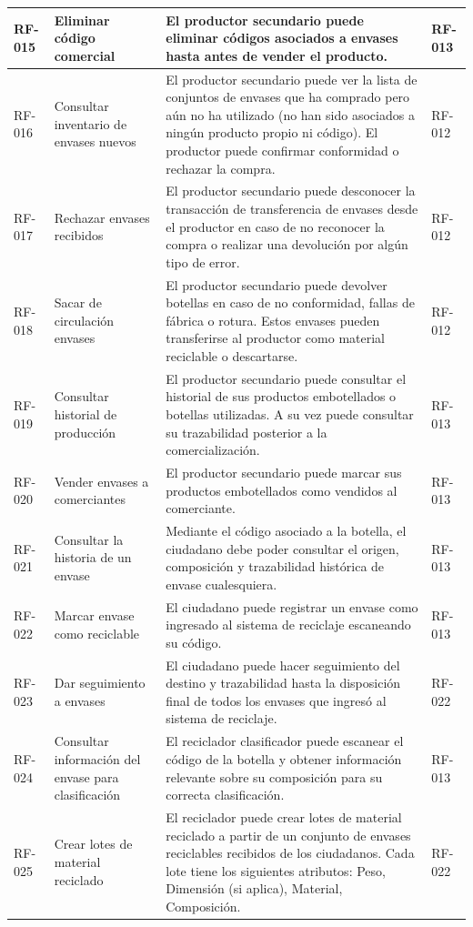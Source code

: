\begin{xltabular}{\textwidth}{@{} L{1.5cm} L{2.5cm} Y L{1.5cm} @{}}
	\hline
	RF-015 & Eliminar código comercial & El productor secundario puede eliminar códigos asociados a envases hasta antes de vender el producto. & RF-013 \\
	\hline
	RF-016 & Consultar inventario de envases nuevos & El productor secundario puede ver la lista de conjuntos de envases que ha comprado pero aún no ha utilizado (no han sido asociados a ningún producto propio ni código). El productor puede confirmar conformidad o rechazar la compra. & RF-012 \\
	\hline
	RF-017 & Rechazar envases recibidos & El productor secundario puede desconocer la transacción de transferencia de envases desde el productor en caso de no reconocer la compra o realizar una devolución por algún tipo de error. & RF-012 \\
	\hline
	RF-018 & Sacar de circulación envases & El productor secundario puede devolver botellas en caso de no conformidad, fallas de fábrica o rotura. Estos envases pueden transferirse al productor como material reciclable o descartarse. & RF-012 \\
	\hline
	RF-019 & Consultar historial de producción & El productor secundario puede consultar el historial de sus productos embotellados o botellas utilizadas. A su vez puede consultar su trazabilidad posterior a la comercialización. & RF-013 \\
	\hline
	RF-020 & Vender envases a comerciantes & El productor secundario puede marcar sus productos embotellados como vendidos al comerciante. & RF-013 \\
	\hline
	RF-021 & Consultar la historia de un envase & Mediante el código asociado a la botella, el ciudadano debe poder consultar el origen, composición y trazabilidad histórica de envase cualesquiera. & RF-013 \\
	\hline
	RF-022 & Marcar envase como reciclable & El ciudadano puede registrar un envase como ingresado al sistema de reciclaje escaneando su código. & RF-013 \\
	\hline
	RF-023 & Dar seguimiento a envases & El ciudadano puede hacer seguimiento del destino y trazabilidad hasta la disposición final de todos los envases que ingresó al sistema de reciclaje. & RF-022 \\
	\hline
	RF-024 & Consultar información del envase para clasificación & El reciclador clasificador puede escanear el código de la botella y obtener información relevante sobre su composición para su correcta clasificación. & RF-013 \\
	\hline
	RF-025 & Crear lotes de material reciclado & El reciclador puede crear lotes de material reciclado a partir de un conjunto de envases reciclables recibidos de los ciudadanos. Cada lote tiene los siguientes atributos: Peso, Dimensión (si aplica), Material, Composición. & RF-022 \\

\end{xltabular}
